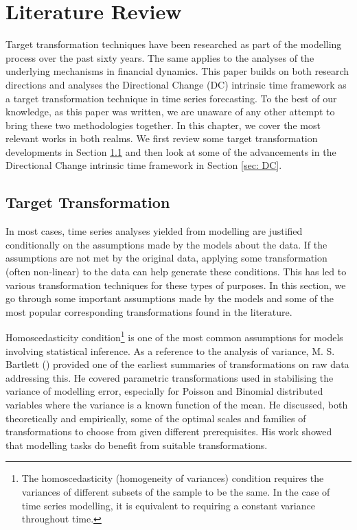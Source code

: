 \chapter{Literature Review}\label{ch: literature review}

Target transformation techniques have been researched as part of the modelling process over the past sixty years. The same applies to the analyses of the underlying mechanisms in financial dynamics. This paper builds on both research directions and analyses the Directional Change (DC) intrinsic time framework as a target transformation technique in time series forecasting. To the best of our knowledge, as this paper was written, we are unaware of any other attempt to bring these two methodologies together. In this chapter, we cover the most relevant works in both realms. We first review some target transformation developments in Section \ref{sec: target transformation} and then look at some of the advancements in the Directional Change intrinsic time framework in Section \ref{sec: DC}.

\section{Target Transformation}\label{sec: target transformation}

In most cases, time series analyses yielded from modelling are justified conditionally on the assumptions made by the models about the data. If the assumptions are not met by the original data, applying some transformation (often non-linear) to the data can help generate these conditions. This has led to various transformation techniques for these types of purposes. In this section, we go through some important assumptions made by the models and some of the most popular corresponding transformations found in the literature.

Homoscedasticity condition\footnote{The homoscedasticity (homogeneity of variances) condition requires the variances of different subsets of the sample to be the same. In the case of time series modelling, it is equivalent to requiring a constant variance throughout time.} is one of the most common assumptions for models involving statistical inference. As a reference to the analysis of variance, M. S. Bartlett (\citeyear{10.2307/3001536}) provided one of the earliest summaries of transformations on raw data addressing this. He covered parametric transformations used in stabilising the variance of modelling error, especially for Poisson and Binomial distributed variables where the variance is a known function of the mean. He discussed, both theoretically and empirically, some of the optimal scales and families of transformations to choose from given different prerequisites. His work showed that modelling tasks do benefit from suitable transformations.

